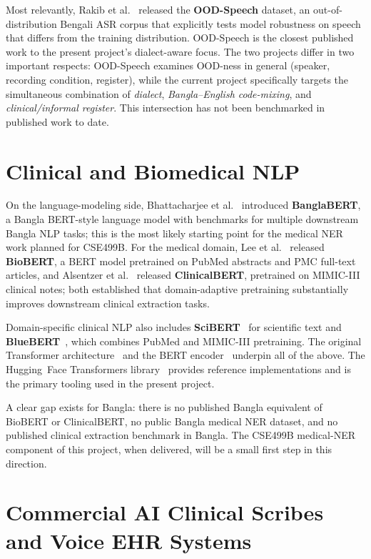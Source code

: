\documentclass[12pt,a4paper]{article}
\begin{document}
Most relevantly, Rakib et al.~\cite{rw:oodspeech} released the
\textbf{OOD-Speech} dataset, an out-of-distribution Bengali ASR
corpus that explicitly tests model robustness on speech that differs
from the training distribution. OOD-Speech is the closest published
work to the present project's dialect-aware focus. The two projects
differ in two important respects: OOD-Speech examines OOD-ness in
general (speaker, recording condition, register), while the current
project specifically targets the simultaneous combination of
\emph{dialect}, \emph{Bangla--English code-mixing}, and
\emph{clinical/informal register}. This intersection has not been
benchmarked in published work to date.

\section{Clinical and Biomedical NLP}

On the language-modeling side, Bhattacharjee et
al.~\cite{rw:banglabert} introduced \textbf{BanglaBERT}, a Bangla
BERT-style language model with benchmarks for multiple downstream
Bangla NLP tasks; this is the most likely starting point for the
medical NER work planned for CSE499B. For the medical domain, Lee
et al.~\cite{rw:biobert} released \textbf{BioBERT}, a BERT model
pretrained on PubMed abstracts and PMC full-text articles, and
Alsentzer et al.~\cite{rw:clinicalbert} released
\textbf{ClinicalBERT}, pretrained on MIMIC-III clinical notes;
both established that domain-adaptive pretraining substantially
improves downstream clinical extraction tasks.

Domain-specific clinical NLP also includes
\textbf{SciBERT}~\cite{rw:scibert} for scientific text and
\textbf{BlueBERT}~\cite{rw:bluebert}, which combines PubMed and
MIMIC-III pretraining. The original Transformer
architecture~\cite{rw:vaswani} and the BERT
encoder~\cite{rw:bert} underpin all of the above. The
Hugging~Face Transformers library~\cite{rw:transformers}
provides reference implementations and is the primary tooling used
in the present project.

A clear gap exists for Bangla: there is no published Bangla
equivalent of BioBERT or ClinicalBERT, no public Bangla medical NER
dataset, and no published clinical extraction benchmark in Bangla.
The CSE499B medical-NER component of this project, when delivered,
will be a small first step in this direction.

\section{Commercial AI Clinical Scribes and Voice EHR Systems}
\end{document}
